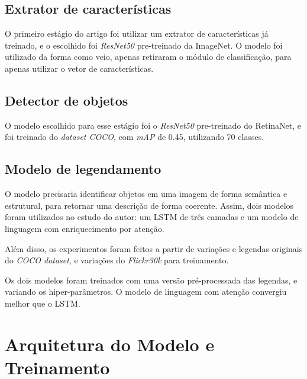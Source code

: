 \documentclass[12pt]{article}
\begin{document}
\subsection*{Extrator de características}

O primeiro estágio do artigo foi utilizar um extrator de características já treinado, e o escolhido foi \textit{ResNet50} pre-treinado da ImageNet. O modelo foi utilizado da forma como veio, apenas retiraram o módulo de classificação, para apenas utilizar o vetor de características.

\subsection*{Detector de objetos}

O modelo escolhido para esse estágio foi o \textit{ResNet50} pre-treinado do RetinaNet, e foi treinado do \textit{dataset COCO}, com \textit{mAP} de 0.45, utilizando 70 classes.

\subsection*{Modelo de legendamento}

O modelo precisaria identificar objetos em uma imagem de forma semântica e estrutural, para retornar uma descrição de forma coerente. Assim, dois modelos foram utilizados no estudo do autor: um LSTM de três camadas e um modelo de linguagem com enriquecimento por atenção. 

Além disso, os experimentos foram feitos a partir de variações e legendas originais do \textit{COCO dataset}, e variações do \textit{Flickr30k} para treinamento.

Os dois modelos foram treinados com uma versão pré-processada das legendas, e variando os hiper-parâmetros. O modelo de linguagem com atenção convergiu melhor que o LSTM.

\section*{Arquitetura do Modelo e Treinamento}
\end{document}

